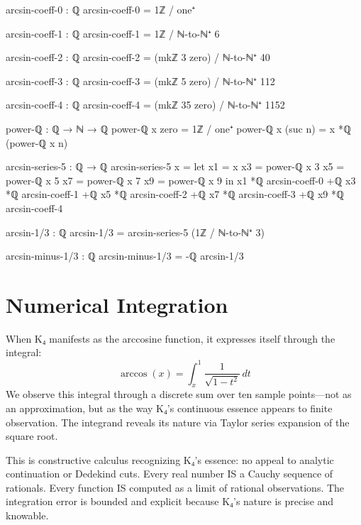\documentclass[11pt,a4paper]{book}
\begin{document}
\begin{code}
arcsin-coeff-0 : ℚ
arcsin-coeff-0 = 1ℤ / one⁺

arcsin-coeff-1 : ℚ  
arcsin-coeff-1 = 1ℤ / ℕ-to-ℕ⁺ 6

arcsin-coeff-2 : ℚ
arcsin-coeff-2 = (mkℤ 3 zero) / ℕ-to-ℕ⁺ 40

arcsin-coeff-3 : ℚ
arcsin-coeff-3 = (mkℤ 5 zero) / ℕ-to-ℕ⁺ 112

arcsin-coeff-4 : ℚ
arcsin-coeff-4 = (mkℤ 35 zero) / ℕ-to-ℕ⁺ 1152

power-ℚ : ℚ → ℕ → ℚ
power-ℚ x zero = 1ℤ / one⁺
power-ℚ x (suc n) = x *ℚ (power-ℚ x n)

arcsin-series-5 : ℚ → ℚ
arcsin-series-5 x = 
  let x1 = x
      x3 = power-ℚ x 3
      x5 = power-ℚ x 5
      x7 = power-ℚ x 7
      x9 = power-ℚ x 9
  in x1 *ℚ arcsin-coeff-0
   +ℚ x3 *ℚ arcsin-coeff-1
   +ℚ x5 *ℚ arcsin-coeff-2
   +ℚ x7 *ℚ arcsin-coeff-3
   +ℚ x9 *ℚ arcsin-coeff-4

arcsin-1/3 : ℚ
arcsin-1/3 = arcsin-series-5 (1ℤ / ℕ-to-ℕ⁺ 3)

arcsin-minus-1/3 : ℚ
arcsin-minus-1/3 = -ℚ arcsin-1/3
\end{code}

\section{Numerical Integration}

When K₄ manifests as the arccosine function, it expresses itself through the integral:
\[
\arccos(x) = \int_x^1 \frac{1}{\sqrt{1-t^2}} \, dt
\]
We observe this integral through a discrete sum over ten sample points—not as an approximation, but as the way K₄'s continuous essence appears to finite observation.
The integrand reveals its nature via Taylor series expansion of the square root.

This is constructive calculus recognizing K₄'s essence: no appeal to analytic continuation or Dedekind cuts.
Every real number IS a Cauchy sequence of rationals. Every function IS computed as a limit of rational observations.
The integration error is bounded and explicit because K₄'s nature is precise and knowable.
\end{document}
